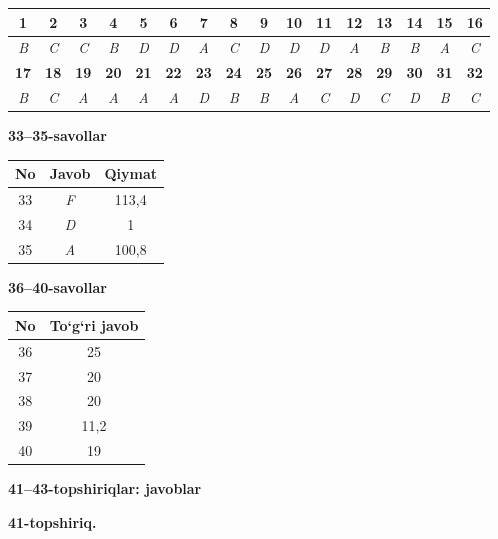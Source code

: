 \documentclass[11pt,a4paper]{article}
\begin{document}
\noindent\begin{tabular}{|c|c|c|c|c|c|c|c|c|c|c|c|c|c|c|c|}\hline
\textbf{1} & \textbf{2} & \textbf{3} & \textbf{4} & \textbf{5} & \textbf{6} & \textbf{7} & \textbf{8} & \textbf{9} & \textbf{10} & \textbf{11} & \textbf{12} & \textbf{13} & \textbf{14} & \textbf{15} & \textbf{16}\\\hline
\textsl{B} & \textsl{C} & \textsl{C} & \textsl{B} & \textsl{D} & \textsl{D} & \textsl{A} & \textsl{C} & \textsl{D} & \textsl{D} & \textsl{D} & \textsl{A} & \textsl{B} & \textsl{B} & \textsl{A} & \textsl{C}\\\hline
\textbf{17} & \textbf{18} & \textbf{19} & \textbf{20} & \textbf{21} & \textbf{22} & \textbf{23} & \textbf{24} & \textbf{25} & \textbf{26} & \textbf{27} & \textbf{28} & \textbf{29} & \textbf{30} & \textbf{31} & \textbf{32}\\\hline
\textsl{B} & \textsl{C} & \textsl{A} & \textsl{A} & \textsl{A} & \textsl{A} & \textsl{D} & \textsl{B} & \textsl{B} & \textsl{A} & \textsl{C} & \textsl{D} & \textsl{C} & \textsl{D} & \textsl{B} & \textsl{C}\\\hline
\end{tabular}\par\medskip
\noindent\textbf{33--35-savollar}\par\smallskip
\noindent\begin{tabular}{|c|c|c|}\hline \textbf{No} & \textbf{Javob} & \textbf{Qiymat}\\\hline
33 & \textsl{F} & 113,4\\\hline
34 & \textsl{D} & 1\\\hline
35 & \textsl{A} & 100,8\\\hline
\end{tabular}\par\medskip
\noindent\textbf{36--40-savollar}\par\smallskip
\noindent\begin{tabular}{|c|c|}\hline \textbf{No} & \textbf{To`g`ri javob}\\\hline
36 & 25\\\hline
37 & 20\\\hline
38 & 20\\\hline
39 & 11,2\\\hline
40 & 19\\\hline
\end{tabular}\par\medskip
\noindent\textbf{41--43-topshiriqlar: javoblar}\par\smallskip
\noindent\textbf{41-topshiriq.}\par
\end{document}
